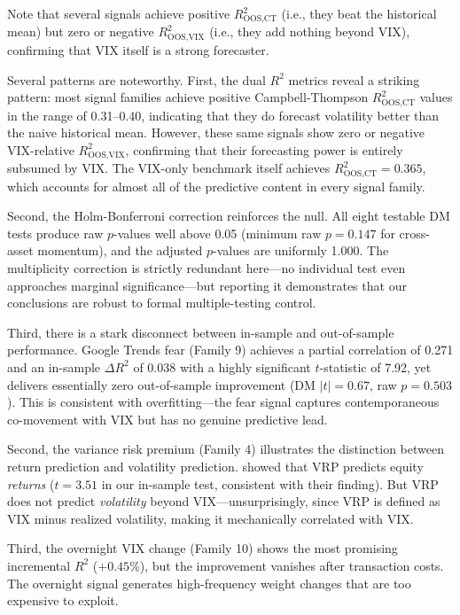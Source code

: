 \documentclass[12pt,a4paper]{article}
\begin{document}
\begin{table}[H]
\begin{threeparttable}
\begin{tablenotes}
\item Note that several signals achieve positive $R^2_{\text{OOS,CT}}$ (i.e., they beat the historical mean) but zero or negative $R^2_{\text{OOS,VIX}}$ (i.e., they add nothing beyond VIX), confirming that VIX itself is a strong forecaster.
\end{tablenotes}
\end{threeparttable}
\end{table}

Several patterns are noteworthy. First, the dual $R^2$ metrics reveal a striking pattern: most signal families achieve positive Campbell-Thompson $R^2_{\text{OOS,CT}}$ values in the range of 0.31--0.40, indicating that they do forecast volatility better than the naive historical mean. However, these same signals show zero or negative VIX-relative $R^2_{\text{OOS,VIX}}$, confirming that their forecasting power is entirely subsumed by VIX. The VIX-only benchmark itself achieves $R^2_{\text{OOS,CT}} = 0.365$, which accounts for almost all of the predictive content in every signal family.

Second, the Holm-Bonferroni correction reinforces the null. All eight testable DM tests produce raw $p$-values well above 0.05 (minimum raw $p = 0.147$ for cross-asset momentum), and the adjusted $p$-values are uniformly 1.000. The multiplicity correction is strictly redundant here---no individual test even approaches marginal significance---but reporting it demonstrates that our conclusions are robust to formal multiple-testing control.

Third, there is a stark disconnect between in-sample and out-of-sample performance. Google Trends fear (Family 9) achieves a partial correlation of 0.271 and an in-sample $\Delta R^2$ of 0.038 with a highly significant $t$-statistic of 7.92, yet delivers essentially zero out-of-sample improvement (DM $|t| = 0.67$, raw $p = 0.503$). This is consistent with overfitting---the fear signal captures contemporaneous co-movement with VIX but has no genuine predictive lead.

Second, the variance risk premium (Family 4) illustrates the distinction between return prediction and volatility prediction. \citet{bollerslev2009} showed that VRP predicts equity \emph{returns} ($t = 3.51$ in our in-sample test, consistent with their finding). But VRP does not predict \emph{volatility} beyond VIX---unsurprisingly, since VRP is defined as VIX minus realized volatility, making it mechanically correlated with VIX.

Third, the overnight VIX change (Family 10) shows the most promising incremental $R^2$ ($+0.45\%$), but the improvement vanishes after transaction costs. The overnight signal generates high-frequency weight changes that are too expensive to exploit.
\end{document}
